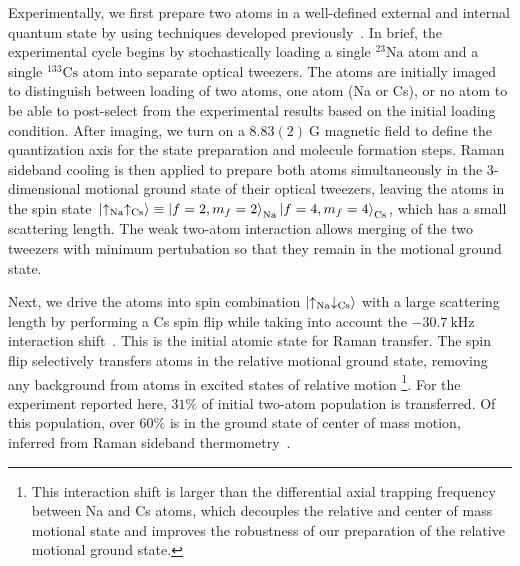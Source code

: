 \documentclass[aps,prl,twocolumn,10pt,superscriptaddress]{revtex4-1}
\newcommand{\Na}{\mathrm{Na}}
\newcommand{\Cs}{\mathrm{Cs}}
\newcommand{\todo}[1]{}
\begin{document}
Experimentally, we first prepare two atoms in a well-defined external and internal quantum state
by using techniques developed previously~\cite{Liu2018, Liu2019, Wang2019}.
In brief, the experimental cycle begins by stochastically loading a single ${}^{23}\Na$ atom
and a single ${}^{133}\Cs$ atom into separate optical tweezers.
The atoms are initially imaged to distinguish between loading of two atoms,
one atom (Na or Cs), or no atom to be able to post-select from the experimental results
based on the initial loading condition.
After imaging, we turn on a $8.83(2)~\mathrm{G}$ magnetic field to define the quantization axis
for the state preparation and molecule formation steps.
Raman sideband cooling is then applied to prepare both atoms simultaneously
in the 3-dimensional motional ground state of their optical tweezers, leaving the atoms in the spin state~$\ket{\uparrow_{\Na}\uparrow_{\Cs}}\equiv \ket{f=2,m_f=2}_{\Na}\ket{f=4,m_f=4}_{\Cs}$,
which has a small scattering length.
The weak two-atom interaction allows merging of the two tweezers with minimum pertubation so that they remain in the motional ground state.

Next, we drive the atoms into spin combination $\ket{\uparrow_{\Na} \downarrow_{\Cs}}$ with a large scattering length
by performing a Cs spin flip while taking into account
the $-30.7~\mathrm{kHz}$ interaction shift~\cite{Hood2019}.
This is the initial atomic state for Raman transfer.
The spin flip selectively transfers atoms in the relative motional ground state,
removing any background from atoms in excited states of relative motion
\footnote{This interaction shift is larger than the differential axial trapping frequency
  between Na and Cs atoms, which decouples the relative and center of mass motional state
  and improves the robustness of our preparation of the relative motional ground state.}.
For the experiment reported here,
$31\mathrm{\%}$ of initial two-atom population is transferred. Of this population, over $60\%$ is in the ground state of center of mass motion, inferred from Raman sideband thermometry~\cite{Zhang2020,He331}. %
\end{document}
